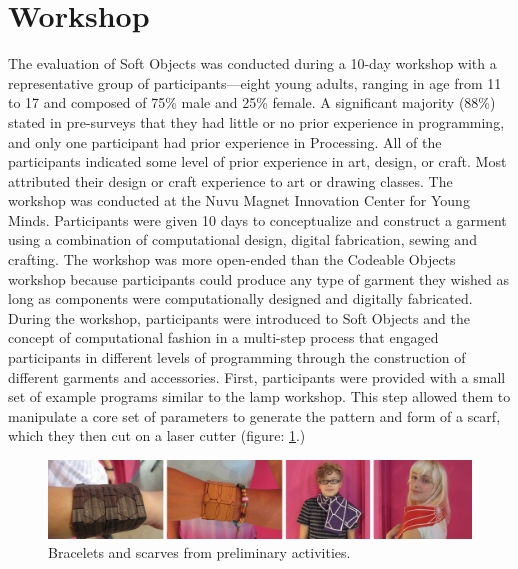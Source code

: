 \section{Workshop}
The evaluation of Soft Objects was conducted during a 10-day workshop with a representative group of participants---eight young adults, ranging in age from 11 to 17 and composed of 75\% male and 25\% female. A significant majority (88\%) stated in pre-surveys that they had little or no prior experience in programming, and only one participant had prior experience in Processing. All of the participants indicated some level of prior experience in art, design, or craft. Most attributed their design or craft experience to art or drawing classes. The workshop was conducted at the Nuvu Magnet Innovation Center for Young Minds. Participants were given 10 days to conceptualize and construct a garment using a combination of computational design, digital fabrication, sewing and crafting. The workshop was more open-ended than the Codeable Objects workshop because participants could produce any type of garment they wished as long as components were computationally designed and digitally fabricated. During the workshop, participants were introduced to Soft Objects and the concept of computational fashion in a multi-step process that engaged participants in different levels of programming through the construction of different garments and accessories. First, participants were provided with a small set of example programs similar to the lamp workshop. This step allowed them to manipulate a core set of parameters to generate the pattern and form of a scarf, which they then cut on a laser cutter (figure: \ref{fig:scarves_bracelets}.) 

\begin{center}
\begin{figure}[h!]
\includegraphics[width=6.5in]{images/scarves_bracelets.png}
\caption{Bracelets and scarves from preliminary activities.}
\label{fig:scarves_bracelets}
\end{figure}
\end{center}


